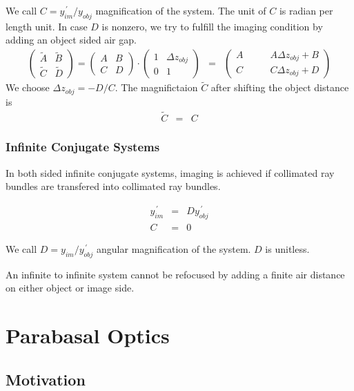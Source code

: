 \documentclass[12pt,a4paper,twoside,openright,BCOR10mm,headsepline,titlepage,abstracton,chapterprefix,final]{scrreprt}
\begin{document}
We call $C = y^{\,\prime}_{im} / y_{obj}$ magnification of the system.
The unit of $C$ is radian per length unit.
In case $D$ is nonzero, we try to fulfill the imaging condition by adding an object sided air gap.
\begin{eqnarray}
 \begin{pmatrix}
  \tilde{A} & \tilde{B} \\ \tilde{C} & \tilde{D}
 \end{pmatrix}
 =
 \begin{pmatrix}
  A & B \\ C & D
 \end{pmatrix}
 \cdot
  \begin{pmatrix}
  1 & \Delta z_{obj} \\ 0 & 1
 \end{pmatrix}
 &=&
 \begin{pmatrix}
  A\qquad & A \Delta z_{obj} + B \\
  C\qquad & C \Delta z_{obj} + D 
 \end{pmatrix}
\end{eqnarray}
We choose $\Delta z_{obj} = - D / C$.
The magnifictaion $\tilde{C}$ after shifting the object distance is
\begin{eqnarray}
 \tilde{C} &=& C 
\end{eqnarray}


\subsubsection{Infinite Conjugate Systems}
In both sided infinite conjugate systems, imaging is achieved if collimated ray bundles are transfered into collimated ray bundles.

\begin{eqnarray}
   y^{\,\prime}_{im} &=& D y^{\,\prime}_{obj} \\
   C &=& 0
\end{eqnarray}

We call $D = y_{im} / y^{\,\prime}_{obj}$ angular magnification of the system.
$D$ is unitless.

An infinite to infinite system cannot be refocused by adding a finite air distance on either object or image side.

\section{Parabasal Optics} \label{sec:ParabasalOptics}

\subsection{Motivation}
\end{document}
